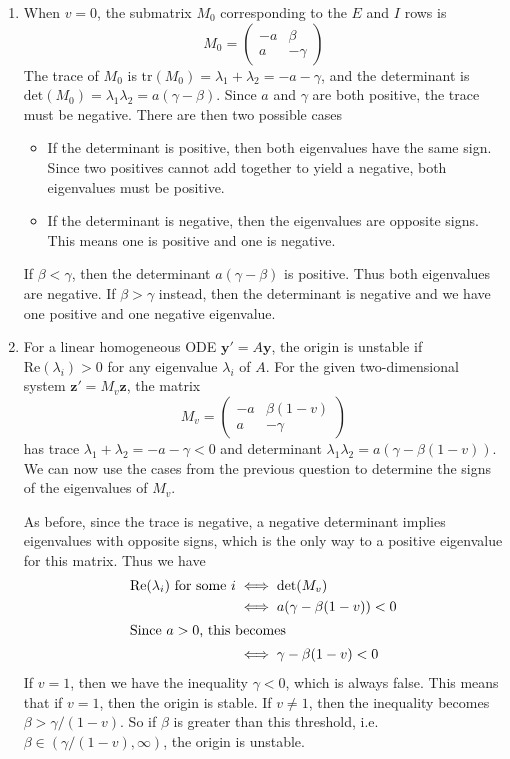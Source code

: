 \documentclass{article}
\begin{document}
\begin{enumerate}
\begin{enumerate}
		\item 
			When $v=0$, the submatrix $M_0$ corresponding to the $E$ and $I$ rows is
			\[
			M_0=
			\begin{pmatrix}
				-a&\beta\\
				a&-\gamma
			\end{pmatrix}
			\] 
			The trace of $M_0$ is $\text{tr}(M_0)= \lambda_1+\lambda_2=-a-\gamma$, and the determinant is $\text{det}(M_0)=\lambda_1 \lambda_2=a(\gamma-\beta)$. Since $a$ and $\gamma$ are both positive, the trace must be negative. There are then two possible cases
			\begin{itemize}
				\item If the determinant is positive, then both eigenvalues have the same sign. Since two positives cannot add together to yield a negative, both eigenvalues must be positive.
				\item If the determinant is negative, then the eigenvalues are opposite signs. This means one is positive and one is negative.
			\end{itemize}
			If $\beta<\gamma$, then the determinant $a(\gamma-\beta)$ is positive. Thus both eigenvalues are negative. If $\beta>\gamma$ instead, then the determinant is negative and we have one positive and one negative eigenvalue.

		\item 
			For a linear homogeneous ODE $\mathbf{y}'=A\mathbf{y}$, the origin is unstable if $\text{Re}(\lambda_i) > 0$ for any eigenvalue $\lambda_i$ of $A$. For the given two-dimensional system $\mathbf{z}'=M_v \mathbf{z}$, the matrix
			\[
			M_v =
			\begin{pmatrix}
				-a & \beta(1-v) \\
				a & -\gamma
			\end{pmatrix}
			\] 
			has trace $\lambda_1+\lambda_2 = -a-\gamma < 0$ and determinant $\lambda_1 \lambda_2 = a(\gamma-\beta(1-v))$. We can now use the cases from the previous question to determine the signs of the eigenvalues of $M_v$.
		
			As before, since the trace is negative, a negative determinant implies eigenvalues with opposite signs, which is the only way to a positive eigenvalue for this matrix. Thus we have
			\begin{align*}
				\text{Re}(\lambda_i) \text{ for some } i &\iff \det(M_v) \\
									 &\iff a(\gamma-\beta(1-v)) < 0 \\
										 \intertext{Since $a>0$, this becomes}
									 &\iff \gamma - \beta(1-v)<0
			\end{align*}
			If $v=1$, then we have the inequality $\gamma<0$, which is always false. This means that if $v=1$, then the origin is stable. If $v\neq 1$, then the inequality becomes $\beta>\gamma/(1-v)$. So if $\beta$ is greater than this threshold, i.e. $\beta\in(\gamma/(1-v), \infty)$, the origin is unstable.


\end{enumerate}
\end{enumerate}
\end{document}

